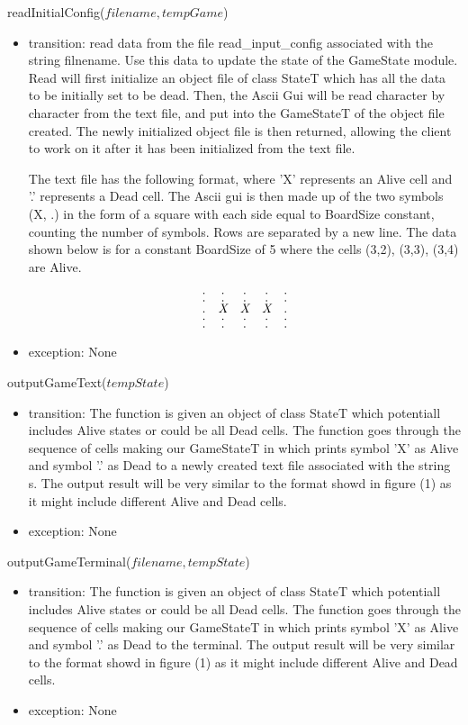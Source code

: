 \documentclass[12pt]{article}
\begin{document}
\noindent readInitialConfig($filename, tempGame$)
\begin{itemize}
\item transition: read data from the file read\_input\_config associated with the string filnename.
  Use this data to update the state of the GameState module. Read will first initialize an object file of class StateT which has all the data to be initially set to be dead. Then, the Ascii Gui will be read character by character from the text file, and put into the GameStateT of the object file created. The newly initialized object file is then returned, allowing the client to work on it after it has been initialized from the text file. 

  The text file has the following format, where 'X' represents an Alive cell and '.' represents a Dead cell. The Ascii gui is then made up of the two symbols (X, .) in the form of a square with each side equal to BoardSize constant, counting the number of symbols. 
 Rows are separated by a new line.  The data shown below is for a constant BoardSize of 5 where the cells (3,2), (3,3), (3,4) are Alive.

  \begin{equation}
\begin{array}{ccccc}
\arraycolsep=1.0pt\def\arraystretch{0.5}
. & . & . & . & .\\
. & . & . & . & .\\
. & \textit{X}& \textit{X} & \textit{X} & .\\
. & . & . & . & .\\
. & . & . & . & .\\
\end{array}
  \end{equation}

\item exception: None
\end{itemize}

\noindent outputGameText($tempState$)
\begin{itemize}
\item transition: The function is given an object of class StateT which potentiall includes Alive states or could be all Dead cells. The function goes through the sequence of cells making our GameStateT in which prints symbol 'X' as Alive and symbol '.' as Dead to a newly created text file associated with the string s. The output result will be very similar to the format showd in figure (1) as it might include different Alive and Dead cells.
\item exception: None

\end{itemize}\noindent outputGameTerminal($filename, tempState$)
\begin{itemize}
\item transition: The function is given an object of class StateT which potentiall includes Alive states or could be all Dead cells. The function goes through the sequence of cells making our GameStateT in which prints symbol 'X' as Alive and symbol '.' as Dead to the terminal. The output result will be very similar to the format showd in figure (1) as it might include different Alive and Dead cells.
\item exception: None
\end{itemize}
\newpage
\end{document}
